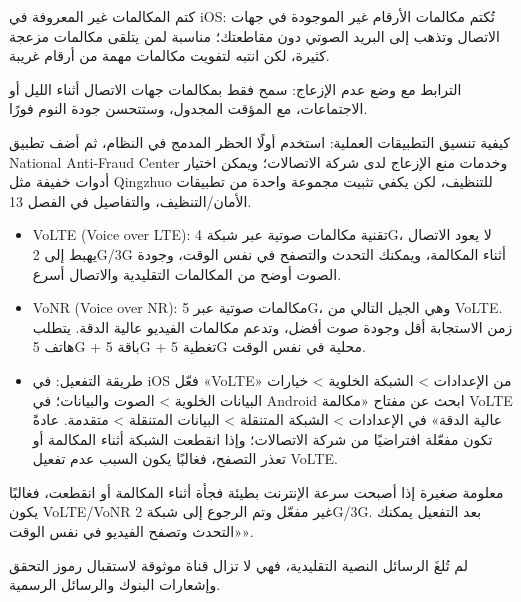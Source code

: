 كتم المكالمات غير المعروفة في iOS: تُكتم مكالمات الأرقام غير الموجودة في جهات الاتصال وتذهب إلى البريد الصوتي دون مقاطعتك؛ مناسبة لمن يتلقى مكالمات مزعجة كثيرة، لكن انتبه لتفويت مكالمات مهمة من أرقام غريبة.

الترابط مع وضع عدم الإزعاج: سمح فقط بمكالمات جهات الاتصال أثناء الليل أو الاجتماعات، مع المؤقت المجدول، وستتحسن جودة النوم فورًا.

كيفية تنسيق التطبيقات العملية: استخدم أولًا الحظر المدمج في النظام، ثم أضف تطبيق National Anti-Fraud Center وخدمات منع الإزعاج لدى شركة الاتصالات؛ ويمكن اختيار أدوات خفيفة مثل Qingzhuo للتنظيف، لكن يكفي تثبيت مجموعة واحدة من تطبيقات الأمان/التنظيف، والتفاصيل في الفصل 13.


\begin{itemize}
  \item VoLTE (Voice over LTE): تقنية مكالمات صوتية عبر شبكة 4G، لا يعود الاتصال يهبط إلى 2G/3G أثناء المكالمة، ويمكنك التحدث والتصفح في نفس الوقت، وجودة الصوت أوضح من المكالمات التقليدية والاتصال أسرع.
  \item VoNR (Voice over NR): مكالمات صوتية عبر 5G، وهي الجيل التالي من VoLTE. زمن الاستجابة أقل وجودة صوت أفضل، وتدعم مكالمات الفيديو عالية الدقة. يتطلب هاتف 5G + باقة 5G + تغطية 5G محلية في نفس الوقت.
  \item طريقة التفعيل: في iOS فعّل «VoLTE» من الإعدادات > الشبكة الخلوية > خيارات البيانات الخلوية > الصوت والبيانات؛ في Android ابحث عن مفتاح «مكالمة VoLTE عالية الدقة» في الإعدادات > الشبكة المتنقلة > البيانات المتنقلة > متقدمة. عادةً تكون مفعّلة افتراضيًا من شركة الاتصالات؛ وإذا انقطعت الشبكة أثناء المكالمة أو تعذر التصفح، فغالبًا يكون السبب عدم تفعيل VoLTE.
\end{itemize}

\begin{tcbinfo}{معلومة صغيرة}
إذا أصبحت سرعة الإنترنت بطيئة فجأة أثناء المكالمة أو انقطعت، فغالبًا يكون VoLTE/VoNR غير مفعّل وتم الرجوع إلى شبكة 2G/3G. بعد التفعيل يمكنك «التحدث وتصفح الفيديو في نفس الوقت».

\end{tcbinfo}


لم تُلغَ الرسائل النصية التقليدية، فهي لا تزال قناة موثوقة لاستقبال رموز التحقق وإشعارات البنوك والرسائل الرسمية.


